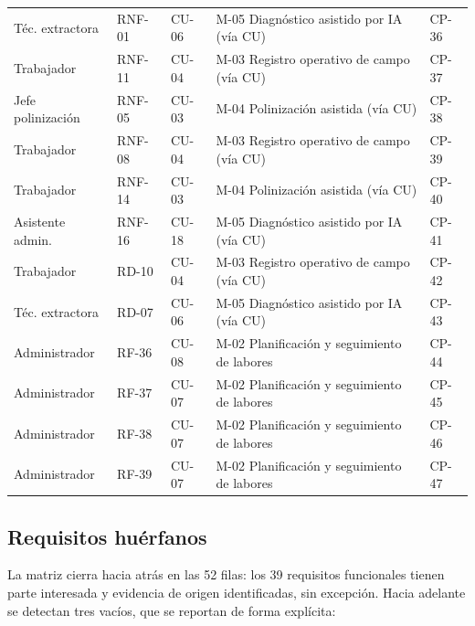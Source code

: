 \documentclass[11pt,letterpaper]{article}
\begin{document}
\begin{longtable}{p{2.6cm} p{1.4cm} p{1.4cm} p{5.4cm} p{1.8cm}}
Téc. extractora & RNF-01 & CU-06 & M-05 Diagnóstico asistido por IA (vía CU) & CP-36\\
Trabajador & RNF-11 & CU-04 & M-03 Registro operativo de campo (vía CU) & CP-37\\
Jefe polinización & RNF-05 & CU-03 & M-04 Polinización asistida (vía CU) & CP-38\\
Trabajador & RNF-08 & CU-04 & M-03 Registro operativo de campo (vía CU) & CP-39\\
Trabajador & RNF-14 & CU-03 & M-04 Polinización asistida (vía CU) & CP-40\\
Asistente admin. & RNF-16 & CU-18 & M-05 Diagnóstico asistido por IA (vía CU) & CP-41\\
Trabajador & RD-10 & CU-04 & M-03 Registro operativo de campo (vía CU) & CP-42\\
Téc. extractora & RD-07 & CU-06 & M-05 Diagnóstico asistido por IA (vía CU) & CP-43\\
Administrador & RF-36 & CU-08 & M-02 Planificación y seguimiento de labores & CP-44\\
Administrador & RF-37 & CU-07 & M-02 Planificación y seguimiento de labores & CP-45\\
Administrador & RF-38 & CU-07 & M-02 Planificación y seguimiento de labores & CP-46\\
Administrador & RF-39 & CU-07 & M-02 Planificación y seguimiento de labores & CP-47\\
\end{longtable}

\subsection*{Requisitos huérfanos}

La matriz cierra hacia atrás en las 52 filas: los 39 requisitos funcionales tienen parte interesada
y evidencia de origen identificadas, sin excepción. Hacia adelante se detectan tres vacíos, que se
reportan de forma explícita:
\end{document}
